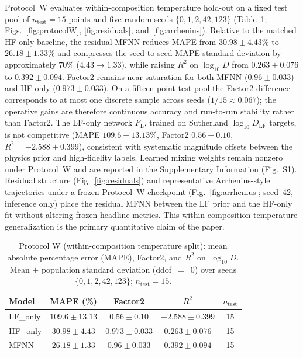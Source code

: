 \documentclass[review,12pt]{elsarticle}
\begin{document}
Protocol~W evaluates within-composition temperature hold-out on a fixed test pool of $n_{\mathrm{test}}=15$ points and five random seeds $\{0,1,2,42,123\}$ (Table~\ref{tab:protocolW}; Figs.~\ref{fig:protocolW}, \ref{fig:residuals}, and~\ref{fig:arrhenius}). Relative to the matched HF-only baseline, the residual MFNN reduces MAPE from $30.98\pm 4.43\%$ to $26.18\pm 1.33\%$ and compresses the seed-to-seed MAPE standard deviation by approximately $70\%$ ($4.43\to 1.33$), while raising $R^{2}$ on $\log_{10} D$ from $0.263\pm 0.076$ to $0.392\pm 0.094$. Factor2 remains near saturation for both MFNN ($0.96\pm 0.033$) and HF-only ($0.973\pm 0.033$). On a fifteen-point test pool the Factor2 difference corresponds to at most one discrete sample across seeds ($1/15\approx 0.067$); the operative gains are therefore continuous accuracy and run-to-run stability rather than Factor2. The LF-only network $F_{\mathrm{L}}$, trained on Sutherland $\log_{10} D_{\mathrm{LF}}$ targets, is not competitive (MAPE $109.6\pm 13.13\%$, Factor2 $0.56\pm 0.10$, $R^{2}=-2.588\pm 0.399$), consistent with systematic magnitude offsets between the physics prior and high-fidelity labels. Learned mixing weights remain nonzero under Protocol~W and are reported in the Supplementary Information (Fig.~S1). Residual structure (Fig.~\ref{fig:residuals}) and representative Arrhenius-style trajectories under a frozen Protocol~W checkpoint (Fig.~\ref{fig:arrhenius}; seed~42, inference only) place the residual MFNN between the LF prior and the HF-only fit without altering frozen headline metrics. This within-composition temperature generalization is the primary quantitative claim of the paper.

\begin{table}[t]
\centering
\caption{Protocol W (within-composition temperature split): mean absolute percentage error (MAPE), Factor2, and $R^{2}$ on $\log_{10} D$. Mean $\pm$ population standard deviation (ddof~$=$~0) over seeds $\{0,1,2,42,123\}$; $n_{\mathrm{test}}=15$.}
\label{tab:protocolW}
\begin{tabular}{@{}lcccc@{}}
\toprule
Model & MAPE (\%) & Factor2 & $R^{2}$ & $n_{\mathrm{test}}$ \\
\midrule
LF\_only & $109.6 \pm 13.13$ & $0.56 \pm 0.10$ & $-2.588 \pm 0.399$ & 15 \\
HF\_only & $30.98 \pm 4.43$ & $0.973 \pm 0.033$ & $0.263 \pm 0.076$ & 15 \\
MFNN    & $26.18 \pm 1.33$ & $0.96 \pm 0.033$ & $0.392 \pm 0.094$ & 15 \\
\bottomrule
\end{tabular}
\end{table}
\end{document}
